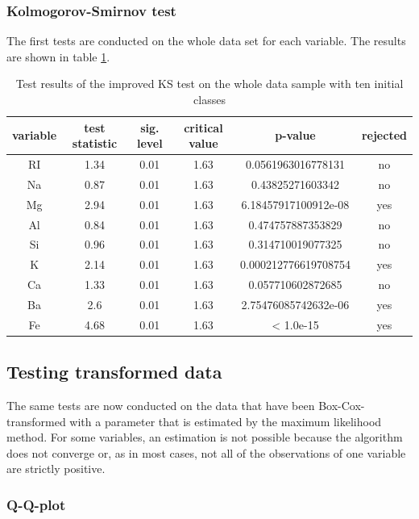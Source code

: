 \documentclass[a4paper, 12pt, titlepage, headsepline, listof = totoc, bibliography = totoc, numbers = noenddot]{scrartcl}
\begin{document}
\subsubsection{Kolmogorov-Smirnov test}

The first tests are conducted on the whole data set for each variable. 
The results are shown in table \ref{tab:KS-full}.

\begin{table}[h!]
\centering
\begin{tabular}{|cccccc|} \hline variable & test statistic & sig. level & critical value & p-value & rejected\\ \hline RI & 1.34 & 0.01 & 1.63 & 0.0561963016778131 & no\\ 
Na & 0.87 & 0.01 & 1.63 & 0.43825271603342 & no\\ 
Mg & 2.94 & 0.01 & 1.63 & 6.18457917100912e-08 & yes\\ 
Al & 0.84 & 0.01 & 1.63 & 0.474757887353829 & no\\ 
Si & 0.96 & 0.01 & 1.63 & 0.314710019077325 & no\\ 
K & 2.14 & 0.01 & 1.63 & 0.000212776619708754 & yes\\ 
Ca & 1.33 & 0.01 & 1.63 & 0.057710602872685 & no\\ 
Ba & 2.6 & 0.01 & 1.63 & 2.75476085742632e-06 & yes\\ 
Fe & 4.68 & 0.01 & 1.63 & < 1.0e-15 & yes\\ \hline \end{tabular}\caption{Test results of the improved KS test on the whole data sample with ten
initial classes}
\label{tab:KS-full}
\end{table}

\subsection{Testing transformed data}

The same tests are now conducted on the data that have been Box-Cox-transformed with a parameter that is estimated by the maximum likelihood method. For some variables, an estimation is not possible because the algorithm does not converge or, as in most cases, not all of the observations of one variable are strictly positive.

\subsubsection{Q-Q-plot}
\end{document}
